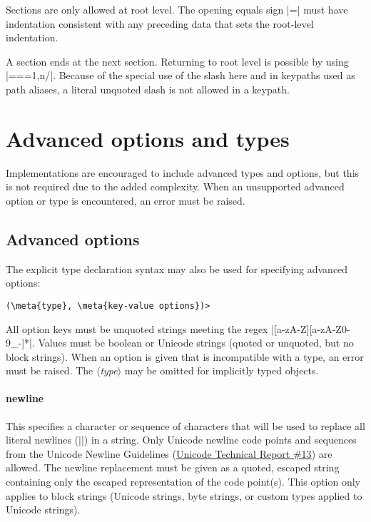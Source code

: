 \documentclass[11pt]{article}
\newcommand{\meta}[1]{\ensuremath{\langle}\textit{#1}\ensuremath{\rangle}}
\newcommand{\vmeta}[1]{{\color{DarkRed}\ensuremath{\langle}\textit{#1}\ensuremath{\rangle}}}
\begin{document}
{{Sections are only allowed at root level.  The opening equals sign |=| must have indentation consistent with any preceding data that sets the root-level indentation.

A section ends at the next section.  Returning to root level is possible by using |==={1,n}/|.  Because of the special use of the slash here and in keypaths used as path aliases, a literal unquoted slash is not allowed in a keypath.



\section{Advanced options and types}
\label{sec:advanced-options}

Implementations are encouraged to include advanced types and options, but this is not required due to the added complexity.  When an unsupported advanced option or type is encountered, an error must be raised.

\subsection{Advanced options}

The explicit type declaration syntax may also be used for specifying advanced options:
\begin{Verbatim}[commandchars=\\\{\}]
(\meta{type}, \meta{key-value options})>
\end{Verbatim}
All option keys must be unquoted strings meeting the regex |[a-zA-Z][a-zA-Z0-9_-]*|.  Values must be boolean or Unicode strings (quoted or unquoted, but no block strings).  When an option is given that is incompatible with a type, an error must be raised.  The \vmeta{type} may be omitted for implicitly typed objects.

\paragraph{newline}
This specifies a character or sequence of characters that will be used to replace all literal newlines (|\n|) in a string.  Only Unicode newline code points and sequences from the Unicode Newline Guidelines (\href{http://unicode.org/standard/reports/tr13/tr13-5.html}{Unicode Technical Report \#13}) are allowed.  The newline replacement must be given as a quoted, escaped string containing only the escaped representation of the code point(s).  This option only applies to block strings (Unicode strings, byte strings, or custom types applied to Unicode strings).

}}
\end{document}
